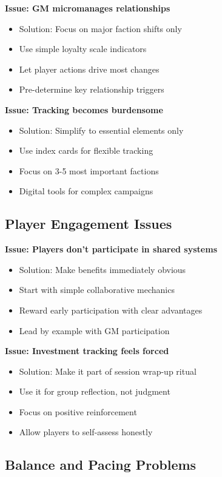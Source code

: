 \textbf{Issue: GM micromanages relationships}
\begin{itemize}
\item Solution: Focus on major faction shifts only
\item Use simple loyalty scale indicators
\item Let player actions drive most changes
\item Pre-determine key relationship triggers
\end{itemize}

\textbf{Issue: Tracking becomes burdensome}
\begin{itemize}
\item Solution: Simplify to essential elements only
\item Use index cards for flexible tracking
\item Focus on 3-5 most important factions
\item Digital tools for complex campaigns
\end{itemize}

\subsection{Player Engagement Issues}

\textbf{Issue: Players don't participate in shared systems}
\begin{itemize}
\item Solution: Make benefits immediately obvious
\item Start with simple collaborative mechanics
\item Reward early participation with clear advantages
\item Lead by example with GM participation
\end{itemize}

\textbf{Issue: Investment tracking feels forced}
\begin{itemize}
\item Solution: Make it part of session wrap-up ritual
\item Use it for group reflection, not judgment
\item Focus on positive reinforcement
\item Allow players to self-assess honestly
\end{itemize}

\subsection{Balance and Pacing Problems}

